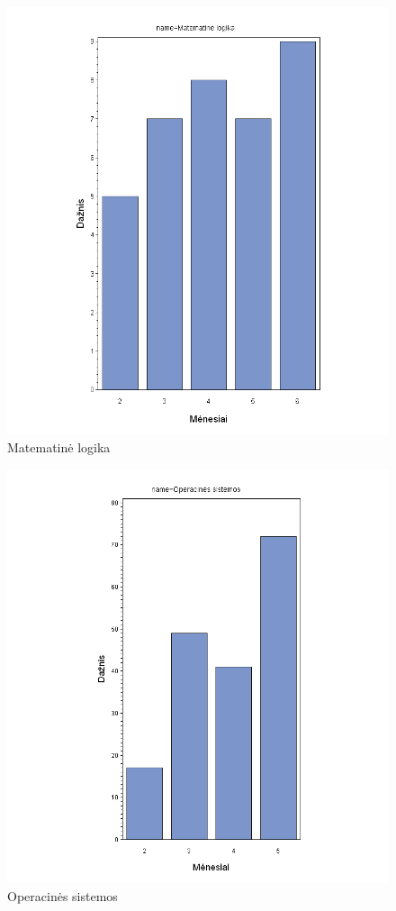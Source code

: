 \begin{figure}[htb]
\includegraphics[width=0.9\linewidth]{images/months/Matematine_logika.png}
\caption{Matematinė logika}
\label{fig:matlog}
\end{figure}

\begin{figure}[htb]
\includegraphics[width=0.9\linewidth]{images/months/Operacines_sistemos.png}
\caption{Operacinės sistemos}
\label{fig:os}
\end{figure}

